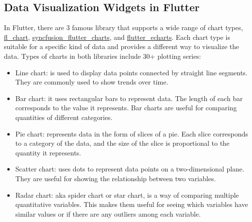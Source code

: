 \subsection{Data Visualization Widgets in Flutter}
In Flutter, there are 3 famous library that supports a wide range of chart types,
\href{https://pub.dev/packages/fl_chart}{fl\_chart},
\href{https://pub.dev/packages/syncfusion_flutter_charts}{syncfusion\_flutter\_charts}, and
\href{https://pub.dev/packages/flutter_echarts}{flutter\_echarts}. Each chart type is
suitable for a specific kind of data and provides a different way to visualize the data. Types of charts in
both libraries include 30+ plotting series:
\begin{itemize}
      \item Line chart: is used to display data points connected by straight line segments. They are commonly
            used to show trends over time.
      \item Bar chart: it uses rectangular bars to represent data. The length of each bar corresponds to the
            value it represents. Bar charts are useful for comparing quantities of different categories.
      \item Pie chart: represents data in the form of slices of a pie. Each slice corresponds to a category
            of the data, and the size of the slice is proportional to the quantity it represents.
      \item Scatter chart: uses dots to represent data points on a two-dimensional plane. They are useful
            for showing the relationship between two variables.
      \item Radar chart: \acrshort{aka} spider chart or star chart, is a way of comparing multiple
            quantitative variables. This makes them useful for seeing which variables have similar values
            or if there are any outliers among each variable.
\end{itemize}

